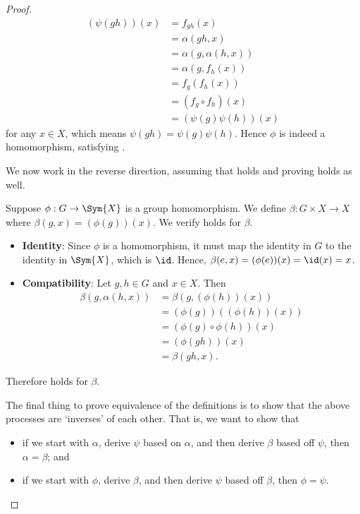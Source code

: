 \begin{proof}
    \begin{align*}
        (\psi(gh))(x) &= f_{gh}(x)\\
        &= \alpha(gh, x)\\
        &= \alpha(g, \alpha(h, x))\\
        &= \alpha(g, f_h(x))\\
        &= f_g(f_h(x))\\
        &= (f_g \circ f_h)(x)\\
        &= (\psi(g)\psi(h))(x)
    \end{align*}
    for any $x \in X$, which means $\psi(gh) = \psi(g)\psi(h)$. Hence $\phi$ is indeed a homomorphism, satisfying .

    We now work in the reverse direction, assuming that  holds and proving  holds as well.
    
    Suppose $\phi: G \to \Sym{X}$ is a group homomorphism. We define $\beta: G \times X \to X$ where $\beta(g, x) = (\phi(g))(x)$. We verify  holds for $\beta$.
    \begin{itemize}
        \item \textbf{Identity}: Since $\phi$ is a homomorphism, it must map the identity in $G$ to the identity in $\Sym{X}$, which is $\id$. Hence, $\beta(e, x) = (\phi(e))(x) = \id(x) = x$.
        \item \textbf{Compatibility}: Let $g, h \in G$ and $x \in X$. Then
        \begin{align*}
            \beta(g, \alpha(h, x)) &= \beta(g, (\phi(h))(x))\\
            &= (\phi(g))((\phi(h))(x))\\
            &= (\phi(g) \circ \phi(h))(x)\\
            &= (\phi(gh))(x)\\
            &= \beta(gh, x).
        \end{align*}
    \end{itemize}
    Therefore  holds for $\beta$.

    The final thing to prove equivalence of the definitions is to show that the above processes are `inverses' of each other. That is, we want to show that
    \begin{itemize}
        \item if we start with $\alpha$, derive $\psi$ based on $\alpha$, and then derive $\beta$ based off $\psi$, then $\alpha = \beta$; and
        \item if we start with $\phi$, derive $\beta$, and then derive $\psi$ based off $\beta$, then $\phi = \psi$.
    \end{itemize}


\end{proof}
